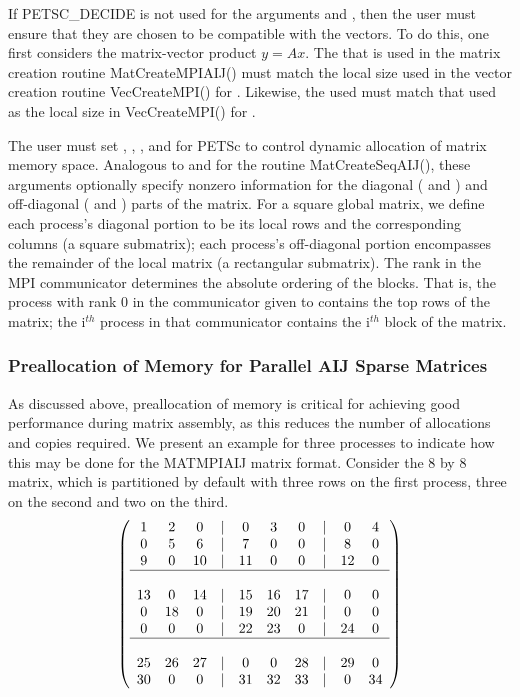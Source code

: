 If PETSC\_DECIDE is not used for the arguments
 and , then the user must ensure that they are chosen to be
compatible with the vectors. To do this, one first considers the matrix-vector product 
$y = A x$. The  that is used in the matrix creation routine MatCreateMPIAIJ()
must match the local size used in the vector creation routine VecCreateMPI() for .
Likewise, the  used must match that used as the local size in 
VecCreateMPI() for . 

The user must set , , , and 
 for PETSc to control dynamic allocation of matrix
memory space.  Analogous to  and  for the routine 
MatCreateSeqAIJ(), these arguments optionally specify 
nonzero information for the diagonal ( and ) and 
off-diagonal ( and ) parts of the matrix. 
For a square global matrix, we define each process's diagonal portion 
to be its local rows and the corresponding columns (a square submatrix);  
each process's off-diagonal portion encompasses the remainder of the
local matrix (a rectangular submatrix).  
The rank in the MPI communicator determines the absolute ordering of the
blocks.  That is, the process with rank 0 in the communicator given to  contains the top rows of the matrix; the i$^{th}$ process
in that communicator contains the i$^{th}$ block of the matrix.

\subsubsection{Preallocation of Memory for Parallel AIJ Sparse Matrices}

As discussed above, preallocation of memory is critical for achieving good
performance during matrix assembly, as this reduces the number of
allocations and copies required.  We present an example for
three processes to indicate how this may be done for the MATMPIAIJ
matrix format.  Consider the 8 by
8 matrix, which is partitioned by default with three rows on the first
process, three on the second and two on the third.  {\small
\[
\left( \begin{array}{cccccccccc} 
1  & 2  & 0  & | & 0  & 3  & 0  & |  & 0  & 4  \\
0  & 5  & 6  & | & 7  & 0  & 0  & |  & 8  & 0 \\
9  & 0  & 10 & | & 11 & 0  & 0  & |  & 12 & 0  \\
\hline \\
13 & 0  & 14 & | & 15 & 16 & 17 & |  & 0  & 0  \\
0  & 18 & 0  & | & 19 & 20 & 21 & |  & 0  & 0 \\
0  & 0  & 0  & | & 22 & 23 & 0  & |  & 24 & 0 \\
\hline \\
25 & 26 & 27 & | & 0  & 0  & 28 & |  & 29 & 0 \\
30 & 0  & 0  & | & 31 & 32 & 33 & |  & 0  &34 
\end{array} \right)
\]
}

